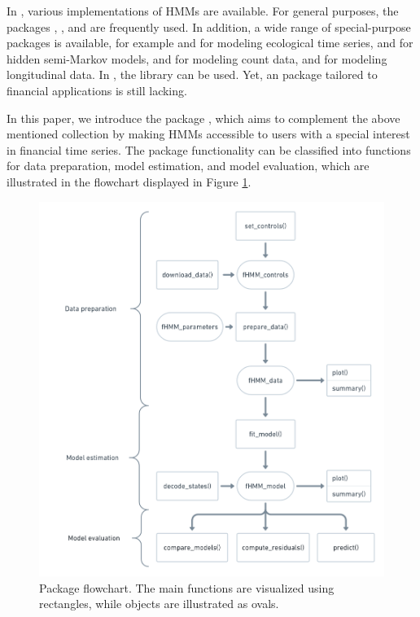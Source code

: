 \documentclass[article]{jss}
\begin{document}
In  \citep{r21}, various implementations of HMMs are available. For general purposes, the packages  \citep{him10},  \citep{vis10}, and  \citep{jac11} are frequently used. In addition, a wide range of special-purpose packages is available, for example  \citep{mic16} and  \citep{mcc18} for modeling ecological time series,  \citep{bul10} and  \citep{oco11} for hidden semi-Markov models,  \citep{tur14} and  \citep{ada19b} for modeling count data, and  \citep{bar17} for modeling longitudinal data. In , the library  \citep{leb22} can be used. Yet, an  package tailored to financial applications is still lacking.

In this paper, we introduce the  package  \citep{oel22}, which aims to complement the above mentioned collection by making HMMs accessible to  users with a special interest in financial time series. The package functionality can be classified into functions for data preparation, model estimation, and model evaluation, which are illustrated in the flowchart displayed in Figure \ref{fig:flowchart}. 
\begin{figure}[t!]
  \includegraphics{flowchart.png}
  \caption{Package flowchart. The main functions are visualized using rectangles, while objects are illustrated as ovals.}
  \label{fig:flowchart}
\end{figure}
\end{document}

